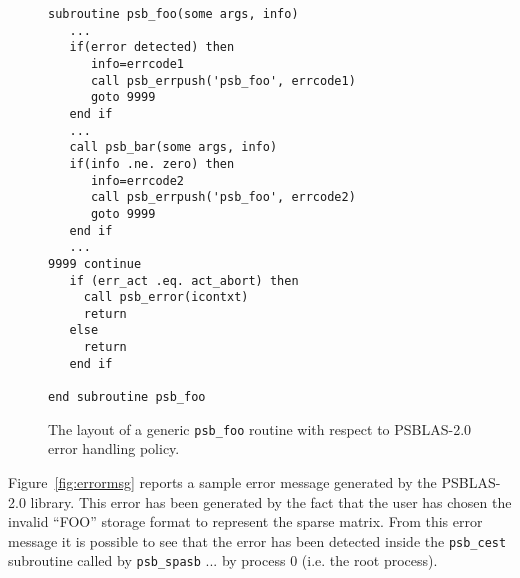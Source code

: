\begin{figure}[h!]
  \begin{Sbox}
    \begin{minipage}[tl]{0.95\textwidth}
\small
\begin{verbatim}
subroutine psb_foo(some args, info)
   ...
   if(error detected) then
      info=errcode1
      call psb_errpush('psb_foo', errcode1)
      goto 9999
   end if
   ...
   call psb_bar(some args, info)
   if(info .ne. zero) then
      info=errcode2
      call psb_errpush('psb_foo', errcode2)
      goto 9999
   end if
   ...
9999 continue
   if (err_act .eq. act_abort) then
     call psb_error(icontxt)
     return
   else
     return
   end if

end subroutine psb_foo
\end{verbatim}
    \end{minipage}
  \end{Sbox}
  \setlength{\fboxsep}{8pt}
  \begin{center}
    \fbox{\TheSbox}
  \end{center}
  \caption{\label{fig:routerr}The layout of a generic \texttt{psb\_foo}
  routine with respect to PSBLAS-2.0 error handling policy.}
\end{figure}




Figure~\ref{fig:errormsg} reports a sample error message generated by
the PSBLAS-2.0 library. This error has been generated by the fact that
the user has chosen the invalid ``FOO'' storage format to represent
the sparse matrix. From this error message it is possible to see that
the error has been detected inside the \verb|psb_cest| subroutine
called by \verb|psb_spasb| ... by process 0 (i.e. the root process).


